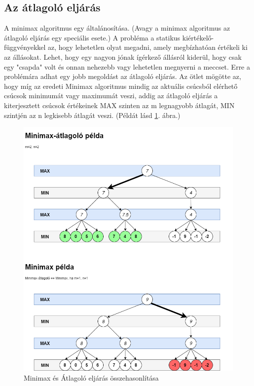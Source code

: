 \documentclass[twoside, a4paper, 12pt]{article}
\begin{document}
\subsection{Az átlagoló eljárás}
A minimax algoritmus egy általánosítása. (Avagy a minimax algoritmus az átlagoló eljárás egy speciális esete.) A probléma a statikus kiértékelő-függvényekkel az, hogy lehetetlen olyat megadni, amely megbízhatóan értékeli ki az állásokat. Lehet, hogy egy nagyon jónak ígérkező állásról kiderül, hogy csak egy "csapda" volt és onnan nehezebb vagy lehetetlen megnyerni a meccset. Erre a problémára adhat egy jobb megoldást az átlagoló eljárás. Az ötlet mögötte az, hogy míg az eredeti Minimax algoritmus mindig az aktuális csúcsból elérhető csúcsok minimumát vagy maximumát veszi, addig az átlagoló eljárás a kiterjesztett csúcsok értékeinek MAX szinten az m legnagyobb átlagát, MIN szintjén az n legkisebb átlagát veszi. (Példát lásd \ref{fig:minimaxVsAverageExample}. ábra.)\cite{bevMiHu}

\begin{figure}[htbp]
	\centering
	\includegraphics[width=\textwidth]{img/minimaxVsAverageExample.png}
	\caption{Minimax és Átlagoló eljárás összehasonlítása\cite{bevMiHu}}
	\label{fig:minimaxVsAverageExample}
\end{figure}
\end{document}
